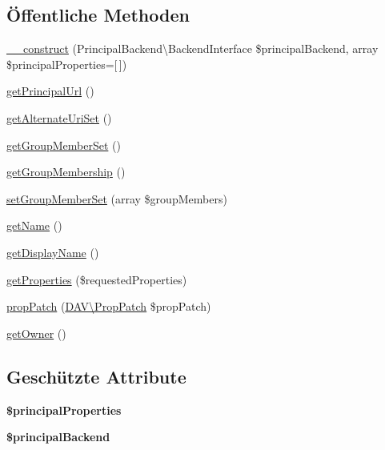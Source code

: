 \subsection*{Öffentliche Methoden}
\begin{DoxyCompactItemize}
\item 
\mbox{\hyperlink{class_sabre_1_1_d_a_v_a_c_l_1_1_principal_ae70c556d73d012cd362c6bf805bec9f6}{\+\_\+\+\_\+construct}} (Principal\+Backend\textbackslash{}\+Backend\+Interface \$principal\+Backend, array \$principal\+Properties=\mbox{[}$\,$\mbox{]})
\item 
\mbox{\hyperlink{class_sabre_1_1_d_a_v_a_c_l_1_1_principal_ab423bb78114f5948783b5b1832f163e7}{get\+Principal\+Url}} ()
\item 
\mbox{\hyperlink{class_sabre_1_1_d_a_v_a_c_l_1_1_principal_ad12886b35e394e367e9d2b1d0b854e44}{get\+Alternate\+Uri\+Set}} ()
\item 
\mbox{\hyperlink{class_sabre_1_1_d_a_v_a_c_l_1_1_principal_afaa4afcbbaa47b295dd84e9e4e71ca25}{get\+Group\+Member\+Set}} ()
\item 
\mbox{\hyperlink{class_sabre_1_1_d_a_v_a_c_l_1_1_principal_a64163e10348143c641f84e3c13de35a6}{get\+Group\+Membership}} ()
\item 
\mbox{\hyperlink{class_sabre_1_1_d_a_v_a_c_l_1_1_principal_a6274148b9a018ed90644755687c61d96}{set\+Group\+Member\+Set}} (array \$group\+Members)
\item 
\mbox{\hyperlink{class_sabre_1_1_d_a_v_a_c_l_1_1_principal_a87c0a0ee299336eca2d79f46662bfe84}{get\+Name}} ()
\item 
\mbox{\hyperlink{class_sabre_1_1_d_a_v_a_c_l_1_1_principal_ab24782e70a36d78a17cac1f33063d656}{get\+Display\+Name}} ()
\item 
\mbox{\hyperlink{class_sabre_1_1_d_a_v_a_c_l_1_1_principal_ac6b4a0da6c62db2d022ae1d413fa7e71}{get\+Properties}} (\$requested\+Properties)
\item 
\mbox{\hyperlink{class_sabre_1_1_d_a_v_a_c_l_1_1_principal_ae9c9fc8afa89a3ca7fc9eb22d2d2017c}{prop\+Patch}} (\mbox{\hyperlink{class_sabre_1_1_d_a_v_1_1_prop_patch}{D\+A\+V\textbackslash{}\+Prop\+Patch}} \$prop\+Patch)
\item 
\mbox{\hyperlink{class_sabre_1_1_d_a_v_a_c_l_1_1_principal_a9b250620ece0dd4a7d13eb2589b44222}{get\+Owner}} ()
\end{DoxyCompactItemize}
\subsection*{Geschützte Attribute}
\begin{DoxyCompactItemize}
\item 
\mbox{\label{class_sabre_1_1_d_a_v_a_c_l_1_1_principal_addce528f6a941ec37f5c2f22efbcb292}} 
{\bfseries \$principal\+Properties}
\item 
\mbox{\label{class_sabre_1_1_d_a_v_a_c_l_1_1_principal_a39f82eb058e72a3aa3c9211672af7b00}} 
{\bfseries \$principal\+Backend}
\end{DoxyCompactItemize}


